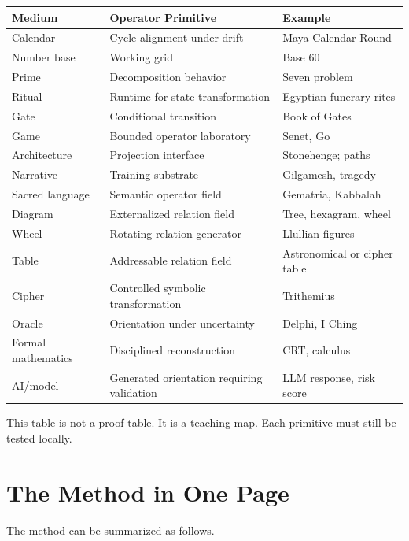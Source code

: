 \documentclass[11pt]{book}
\begin{document}
\begin{center}
\begin{tabular}{p{} p{} p{}}
\hline
\textbf{Medium} & \textbf{Operator Primitive} & \textbf{Example} \\
\hline
Calendar & Cycle alignment under drift & Maya Calendar Round \\
Number base & Working grid & Base 60 \\
Prime & Decomposition behavior & Seven problem \\
Ritual & Runtime for state transformation & Egyptian funerary rites \\
Gate & Conditional transition & Book of Gates \\
Game & Bounded operator laboratory & Senet, Go \\
Architecture & Projection interface & Stonehenge; paths \\
Narrative & Training substrate & Gilgamesh, tragedy \\
Sacred language & Semantic operator field & Gematria, Kabbalah \\
Diagram & Externalized relation field & Tree, hexagram, wheel \\
Wheel & Rotating relation generator & Llullian figures \\
Table & Addressable relation field & Astronomical or cipher table \\
Cipher & Controlled symbolic transformation & Trithemius \\
Oracle & Orientation under uncertainty & Delphi, I Ching \\
Formal mathematics & Disciplined reconstruction & CRT, calculus \\
AI/model & Generated orientation requiring validation & LLM response, risk score \\
\hline
\end{tabular}
\end{center}

This table is not a proof table. It is a teaching map. Each primitive must still be tested locally.

\section{The Method in One Page}

The method can be summarized as follows.
\end{document}
